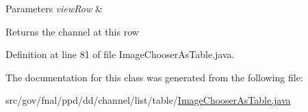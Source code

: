 \begin{DoxyParams}{Parameters}
{\em view\-Row} & \\
\hline
\end{DoxyParams}
\begin{DoxyReturn}{Returns}
the channel at this row 
\end{DoxyReturn}


Definition at line 81 of file Image\-Chooser\-As\-Table.\-java.



The documentation for this class was generated from the following file\-:\begin{DoxyCompactItemize}
\item 
src/gov/fnal/ppd/dd/channel/list/table/\hyperlink{ImageChooserAsTable_8java}{Image\-Chooser\-As\-Table.\-java}\end{DoxyCompactItemize}
